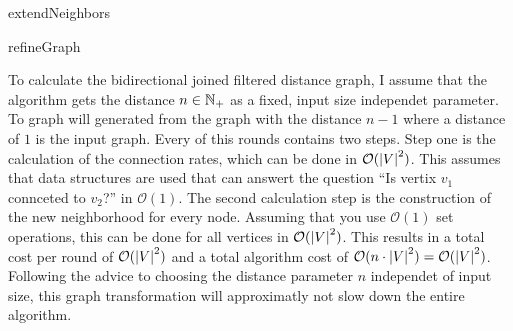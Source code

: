 \begin{algorithm}


	\caption{extendNeighbors}
\end{algorithm}

\begin{algorithm}


	\caption{refineGraph}
\end{algorithm}

To calculate the bidirectional joined filtered distance graph, I assume that the algorithm gets the distance $n \in \mathbb{N}_+$ as a fixed, input size independet parameter. To graph will generated from the graph with the distance $n-1$ where a distance of $1$ is the input graph. Every of this rounds contains two steps. Step one is the calculation of the connection rates, which can be done in $\mathcal{O} ( \left|V\right|^2 )$. This assumes that data structures are used that can answert the question ``Is vertix $v_1$ connceted to $v_2$?'' in $\mathcal{O} ( 1 )$. The second calculation step is the construction of the new neighborhood for every node. Assuming that you use $\mathcal{O} ( 1 )$ set operations, this can be done for all vertices in $\mathcal{O} ( \left|V\right|^2 )$. This results in a total cost per round of $\mathcal{O} ( \left|V\right|^2 )$ and a total algorithm cost of $\mathcal{O} ( n \cdot \left|V\right|^2 ) = \mathcal{O} ( \left|V\right|^2 )$. Following the advice to choosing the distance parameter $n$ independet of input size, this graph transformation will approximatly not slow down the entire algorithm.

